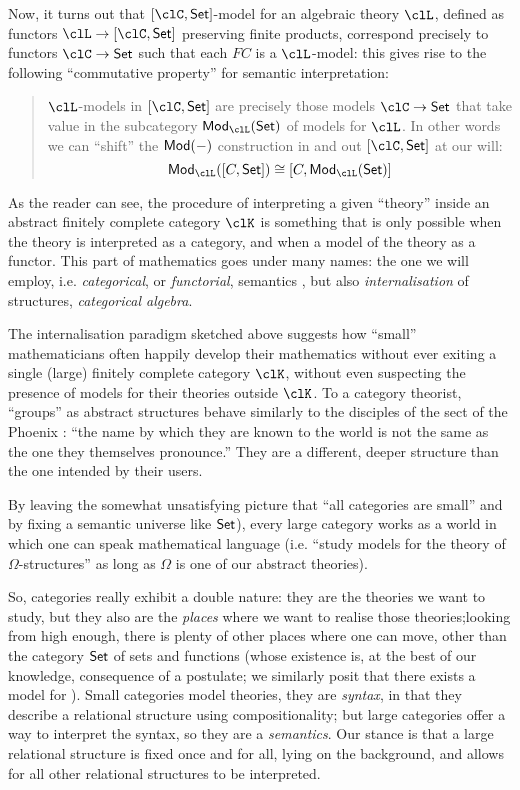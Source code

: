 Now, it turns out that $[\clC,\Set]$-model for an algebraic theory $\clL$, defined as functors $\clL \to [\clC,\Set]$ preserving finite products, correspond precisely to functors $\clC\to \Set$ such that each $FC$ is a $\clL$-model: this gives rise to the following ``commutative property'' for semantic interpretation:
\begin{quote}
	$\clL$-models in $[\clC,\Set]$ are precisely those models $\clC \to \Set$ that take value in the subcategory $\cate{Mod}_{\clL}(\Set)$ of models for $\clL$. In other words we can ``shift'' the $\mathsf{Mod}(-)$ construction in and out $[\clC,\Set]$ at our will:
	\[
		\cate{Mod}_{\clL}([C,\Set]) \cong [C, \cate{Mod}_{\clL}(\Set)]
	\]
\end{quote}
As the reader can see, the procedure of interpreting a given ``theory'' inside an abstract finitely complete category $\clK$ is something that is only possible when the theory is interpreted as a category, and when a model of the theory as a functor. This part of mathematics goes under many names: the one we will employ, i.e. \emph{categorical}, or \emph{functorial}, semantics \cite{lawvere1963functorial}, but also \emph{internalisation} of structures, \emph{categorical algebra}.

The internalisation paradigm sketched above suggests how ``small'' mathematicians often happily develop their mathematics without ever exiting a single (large) finitely complete category $\clK$, without even suspecting the presence of models for their theories outside $\clK$. To a category theorist, ``groups'' as abstract structures behave similarly to the disciples of the sect of the Phoenix \cite{fenix}: ``the name by which they are known to the world
is not the same as the one they themselves pronounce.'' They are a different, deeper structure than the one intended by their users.

By leaving the somewhat unsatisfying picture that ``all categories are small'' and by fixing a semantic universe like $\mathsf{Set}$), every large category works as a world in which one can speak mathematical language (i.e. ``study models for the theory of $\Omega$-structures'' as long as $\Omega$ is one of our abstract theories).

So, categories really exhibit a double nature: they are the theories we want to study, but they also are the \emph{places} where we want to realise those theories;looking from high enough, there is plenty of other places where one can move, other than the category $\mathsf{Set}$ of sets and functions (whose existence is, at the best of our knowledge, consequence of a postulate; we similarly posit that there exists a model for ). Small categories model theories, they are \emph{syntax}, in that they describe a relational structure using compositionality; but large categories offer a way to interpret the syntax, so they are a \emph{semantics}. Our stance is that a large relational structure is fixed once and for all, lying on the background, and allows for all other relational structures to be interpreted.

